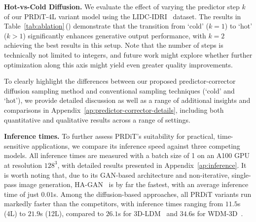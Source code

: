 \textbf{Hot-vs-Cold Diffusion.}\;\;
We evaluate the effect of varying the predictor step $k$ of our PRDiT\mbox{-}4L variant model using the LIDC-IDRI~\citep{armato2011lung} dataset. The results in Table~\ref{tab:ablation}\,() demonstrate that the transition from `cold' ($k=1$) to `hot' ($k>1$) significantly enhances generative output performance, with $k=2$ achieving the best results in this setup. Note that the number of steps is technically not limited to integers, and future work might explore whether further optimization along this axis might yield even greater quality improvements.

To clearly highlight the differences between our proposed predictor-corrector diffusion sampling method and conventional sampling techniques (`cold' and `hot'), we provide detailed discussion as well as a range of additional insights and comparisons in Appendix~\ref{ap:predictor-corrector-details}, including both quantitative and qualitative results across a range of settings.

\textbf{Inference times.}\;\; To further assess PRDiT’s suitability for practical, time-sensitive applications, we compare its inference speed against three competing models. All inference times are measured with a batch size of 1 on an A100 GPU at resolution $128^3$, with detailed results presented in Appendix~\ref{ap:inference}. It is worth noting that, due to its GAN-based architecture and non-iterative, single-pass image generation, HA\mbox{-}GAN~\citep{sun2022hierarchical} is by far the fastest, with an average inference time of just $0.01$s. Among the diffusion-based approaches, all PRDiT variants run markedly faster than the competitors, with inference times ranging from $11.5$s (4L) to $21.9$s (12L), compared to $26.1$s for 3D-LDM~\citep{khader2023medical} and $34.6$s for WDM-3D~\citep{friedrich2024wdm}.


